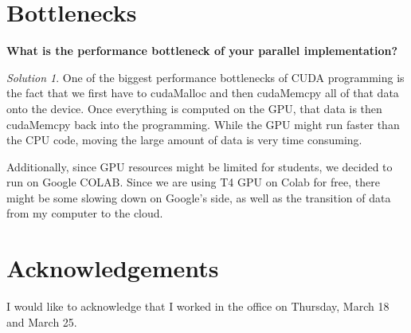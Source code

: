 \documentclass[a4paper,12pt]{article}
\theoremstyle{definition}
\theoremstyle{remark}
\newtheorem*{solution}{Solution}
\begin{document}
\section{Bottlenecks}
\textbf{What is the performance bottleneck of your parallel implementation?}
\begin{solution}
	One of the biggest performance bottlenecks of CUDA programming is the fact that we first have to cudaMalloc and then cudaMemcpy all of that data onto the device. Once everything is computed on the GPU, that data is then cudaMemcpy back into the programming. While the GPU might run faster than the CPU code, moving the large amount of data is very time consuming. 
	
	Additionally, since GPU resources might be limited for students, we decided to run on Google COLAB.  Since we are using T4 GPU on Colab for free, there might be some slowing down on Google's side, as well as the transition of data from my computer to the cloud.
\end{solution}
	
	
	
\section*{Acknowledgements}
	I would like to acknowledge that I worked in the office on Thursday, March 18 and March 25.
	
\end{document}
